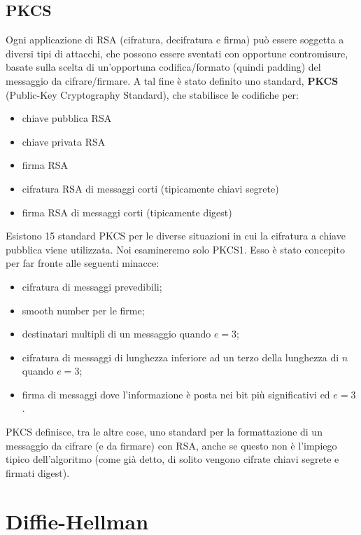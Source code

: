 \subsection{PKCS} \label{sec:pkcs}
Ogni applicazione di RSA (cifratura, decifratura e firma) può essere soggetta a diversi tipi di attacchi, che possono essere sventati con opportune contromisure, basate sulla scelta di un'opportuna codifica/formato (quindi padding) del messaggio da cifrare/firmare. A tal fine è stato definito uno standard, \textbf{PKCS} (Public-Key Cryptography Standard), che stabilisce le codifiche per:
\begin{itemize}
\item chiave pubblica RSA
\item chiave privata RSA
\item firma RSA
\item cifratura RSA di messaggi corti (tipicamente chiavi segrete)
\item firma RSA di messaggi corti (tipicamente digest)
\end{itemize}
Esistono 15 standard PKCS per le diverse situazioni in cui la cifratura a chiave pubblica viene utilizzata. Noi esamineremo solo PKCS1. Esso è stato concepito per far fronte alle seguenti minacce:
\begin{itemize}
\item cifratura di messaggi prevedibili;
\item smooth number per le firme;
\item destinatari multipli di un messaggio quando $e=3$;
\item cifratura di messaggi di lunghezza inferiore ad un terzo della lunghezza di $n$ quando $e=3$;
\item firma di messaggi dove l'informazione è posta nei bit più significativi ed $e = 3$.
\end{itemize}
PKCS definisce, tra le altre cose, uno standard per la formattazione di un messaggio da cifrare (e da firmare) con RSA, anche se questo non è l'impiego tipico dell'algoritmo (come già detto, di solito vengono cifrate chiavi segrete e firmati digest). 

\section{Diffie-Hellman}

